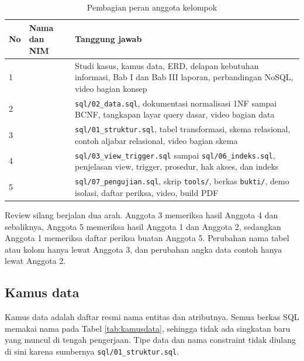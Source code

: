 \documentclass[12pt,a4paper]{article}
\begin{document}
\begin{table}[ht]
\centering
\caption{Pembagian peran anggota kelompok}
\small
\begin{tabularx}{\textwidth}{@{}p{0.8cm}p{3.4cm}X@{}}
\toprule
\textbf{No} & \textbf{Nama dan NIM} & \textbf{Tanggung jawab} \\
\midrule
1 & \underline{\hspace{3.4cm}} & Studi kasus, kamus data, ERD, delapan kebutuhan informasi, Bab I dan Bab III laporan, perbandingan NoSQL, video bagian konsep \\
2 & \underline{\hspace{3.4cm}} & \texttt{sql/02\_data.sql}, dokumentasi normalisasi 1NF sampai BCNF, tangkapan layar query dasar, video bagian data \\
3 & \underline{\hspace{3.4cm}} & \texttt{sql/01\_struktur.sql}, tabel transformasi, skema relasional, contoh aljabar relasional, video bagian skema \\
4 & \underline{\hspace{3.4cm}} & \texttt{sql/03\_view\_trigger.sql} sampai \texttt{sql/06\_indeks.sql}, penjelasan view, trigger, prosedur, hak akses, dan indeks \\
5 & \underline{\hspace{3.4cm}} & \texttt{sql/07\_pengujian.sql}, skrip \texttt{tools/}, berkas \texttt{bukti/}, demo isolasi, daftar periksa, video, build PDF \\
\bottomrule
\end{tabularx}
\end{table}

Review silang berjalan dua arah. Anggota 3 memeriksa hasil Anggota 4 dan
sebaliknya, Anggota 5 memeriksa hasil Anggota 1 dan Anggota 2, sedangkan
Anggota 1 memeriksa daftar periksa buatan Anggota 5. Perubahan nama tabel atau
kolom hanya lewat Anggota 3, dan perubahan angka data contoh hanya lewat
Anggota 2.

\subsection{Kamus data}

Kamus data adalah daftar resmi nama entitas dan atributnya. Semua berkas SQL
memakai nama pada Tabel \ref{tab:kamusdata}, sehingga tidak ada singkatan baru
yang muncul di tengah pengerjaan. Tipe data dan nama constraint tidak diulang di
sini karena sumbernya \texttt{sql/01\_struktur.sql}.
\end{document}
